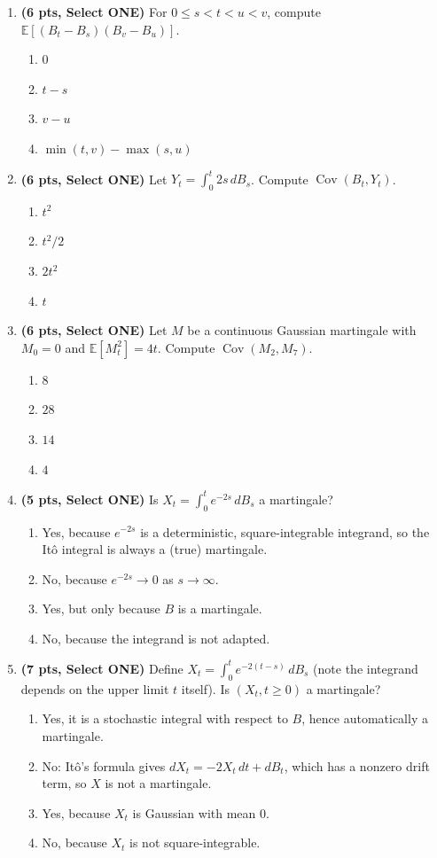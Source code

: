 \documentclass[11pt]{article}
\newcommand{\E}{\mathbb{E}}
\DeclareMathOperator{\Cov}{Cov}
\begin{document}
\begin{enumerate}
\item[\textbf{Q10.}] \textbf{(6 pts, Select ONE)} For $0\le s<t<u<v$, compute $\E[(B_t-B_s)(B_v-B_u)]$.
\begin{enumerate}
  \item $0$
  \item $t-s$
  \item $v-u$
  \item $\min(t,v)-\max(s,u)$
\end{enumerate}

\item[\textbf{Q11.}] \textbf{(6 pts, Select ONE)} Let $Y_t=\int_0^t 2s\,dB_s$. Compute $\Cov(B_t,Y_t)$.
\begin{enumerate}
  \item $t^2$
  \item $t^2/2$
  \item $2t^2$
  \item $t$
\end{enumerate}

\item[\textbf{Q12.}] \textbf{(6 pts, Select ONE)} Let $M$ be a continuous Gaussian martingale with $M_0=0$ and $\E[M_t^2]=4t$. Compute $\Cov(M_2,M_7)$.
\begin{enumerate}
  \item $8$
  \item $28$
  \item $14$
  \item $4$
\end{enumerate}

\item[\textbf{Q13.}] \textbf{(5 pts, Select ONE)} Is $X_t=\int_0^t e^{-2s}\,dB_s$ a martingale?
\begin{enumerate}
  \item Yes, because $e^{-2s}$ is a deterministic, square-integrable integrand, so the Itô integral is always a (true) martingale.
  \item No, because $e^{-2s}\to 0$ as $s\to\infty$.
  \item Yes, but only because $B$ is a martingale.
  \item No, because the integrand is not adapted.
\end{enumerate}

\item[\textbf{Q14.}] \textbf{(7 pts, Select ONE)} Define $X_t=\int_0^t e^{-2(t-s)}\,dB_s$ (note the integrand depends on the upper limit $t$ itself). Is $(X_t,t\ge0)$ a martingale?
\begin{enumerate}
  \item Yes, it is a stochastic integral with respect to $B$, hence automatically a martingale.
  \item No: Itô's formula gives $dX_t=-2X_t\,dt+dB_t$, which has a nonzero drift term, so $X$ is not a martingale.
  \item Yes, because $X_t$ is Gaussian with mean $0$.
  \item No, because $X_t$ is not square-integrable.
\end{enumerate}


\end{enumerate}
\end{document}
